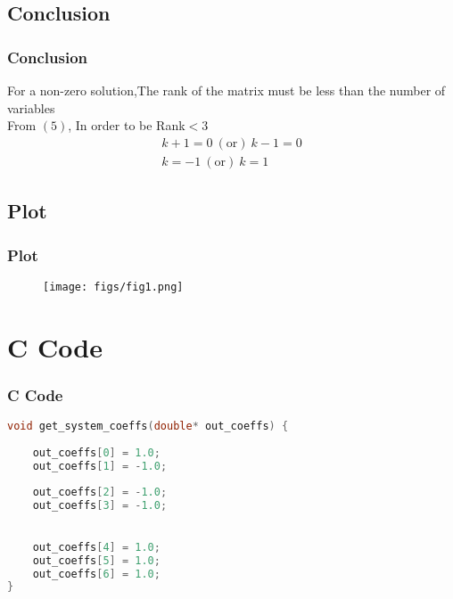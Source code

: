 \documentclass{beamer}
\providecommand{\brak}[1]{\ensuremath{\left(#1\right)}}
\theoremstyle{remark}
\numberwithin{equation}{section}
\begin{document}
\subsection{Conclusion}
\begin{frame}
\frametitle{Conclusion}
For a non-zero solution,The rank of the matrix must be less than the number of variables \\
From \brak{5}, In order to be Rank$<$3 
\begin{align}
    k+1=0\ \brak{\text{or}}\ k-1=0 \\
    k=-1\ \brak{\text{or}}\ k=1
\end{align}
\end{frame}
 
\subsection{Plot}
\begin{frame}[fragile]
\frametitle{Plot}

\begin{figure}[h!]
   \centering
   \texttt{[image: figs/fig1.png]}
	\caption{}
   \label{}
\end{figure}
\end{frame}

\section{C Code}
\begin{frame}[fragile]
\frametitle{C Code}
\begin{lstlisting}[language=C]
void get_system_coeffs(double* out_coeffs) {
     
    out_coeffs[0] = 1.0;
    out_coeffs[1] = -1.0;
   
    out_coeffs[2] = -1.0;
    out_coeffs[3] = -1.0;
    

    out_coeffs[4] = 1.0;
    out_coeffs[5] = 1.0;
    out_coeffs[6] = 1.0;
}
    \end{lstlisting}
\end{frame}
\end{document}
